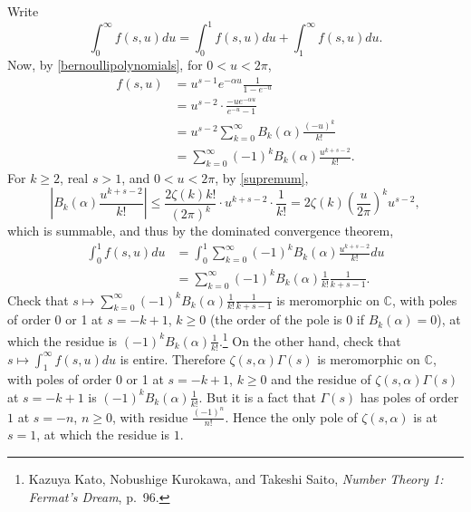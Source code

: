 \documentclass{article}
\theoremstyle{definition}
\begin{document}
Write
\[
\int_0^\infty f(s,u) du = \int_0^1 f(s,u) du + \int_1^\infty f(s,u) du.
\]
Now, by \eqref{bernoullipolynomials}, for $0<u<2\pi$,
\begin{align*}
f(s,u) &= u^{s-1} e^{-\alpha u} \frac{1}{1-e^{-u}}\\
&= u^{s-2} \cdot \frac{-u e^{-\alpha u}}{e^{-u}-1}\\
&=u^{s-2} \sum_{k=0}^\infty B_k(\alpha) \frac{(-u)^k}{k!}\\
&=\sum_{k=0}^\infty (-1)^k B_k(\alpha) \frac{u^{k+s-2}}{k!}.
\end{align*}
For $k \geq 2$, real $s>1$, and $0<u<2\pi$, by \eqref{supremum},
\[
\left| B_k(\alpha) \frac{u^{k+s-2}}{k!} \right| \leq \frac{2\zeta(k) k!}{(2\pi)^k} \cdot u^{k+s-2} \cdot
\frac{1}{k!}
=2\zeta(k)\left( \frac{u}{2\pi} \right)^k u^{s-2},
\]
which is summable,
and thus by the dominated convergence theorem,
\begin{align*}
\int_0^1 f(s,u) du &= \int_0^1 \sum_{k=0}^\infty (-1)^k B_k(\alpha) \frac{u^{k+s-2}}{k!} du\\
&=\sum_{k=0}^\infty (-1)^k B_k(\alpha) \frac{1}{k!} \frac{1}{k+s-1}.
\end{align*}
Check that $s \mapsto \sum_{k=0}^\infty (-1)^k B_k(\alpha) \frac{1}{k!} \frac{1}{k+s-1}$ is meromorphic
on $\mathbb{C}$, with poles of order 0 or 1 at $s=-k+1$, $k \geq 0$ (the order of the pole is $0$ if
$B_k(\alpha)=0$), at which the residue is
$(-1)^k B_k(\alpha) \frac{1}{k!}$.\footnote{Kazuya Kato, Nobushige Kurokawa, 
and Takeshi Saito, {\em Number Theory 1: Fermat's Dream}, p.~96.}
On the other hand, check that $s \mapsto \int_1^\infty f(s,u) du$ is entire. 
Therefore $\zeta(s,\alpha) \Gamma(s)$ is meromorphic on $\mathbb{C}$, with  poles of order 0 or 1 at
$s=-k+1$, $k \geq 0$ and the residue of $\zeta(s,\alpha) \Gamma(s)$ at $s=-k+1$ is $(-1)^k B_k(\alpha) 
\frac{1}{k!}$.
But it is a fact that 
$\Gamma(s)$ has poles of order $1$ at $s=-n$, $n \geq 0$, with residue $\frac{(-1)^n}{n!}$.  
Hence the only pole of $\zeta(s,\alpha)$ is at $s=1$, at which the residue is $1$. 
\end{document}
